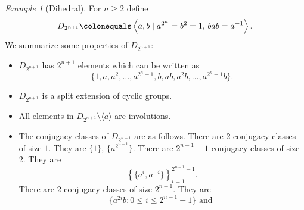 \documentclass{dcthesis}
\numberwithin{equation}{section}
\theoremstyle{definition}
\theoremstyle{remark}
\newtheorem{example}[equation]{Example}
\begin{document}
{{      %
    \begin{example}[Dihedral]
      \label{exm:dihedral}
      For $n\geq 2$ define
      \begin{equation}
        \label{eqn:dihedral}
        D_{2^{n+1}}\colonequals
        \left\langle
          a,b\mid
          a^{2^{n}}=
          b^2=1,
          \,
          bab=a^{-1}
        \right\rangle.
      \end{equation}
      We summarize some properties of $D_{2^{n+1}}$:
      \begin{itemize}
        \item
          $D_{2^{n+1}}$ has $2^{n+1}$ elements which can be written as
          \begin{equation}
            \label{eqn:elementsofdihedral}
            \{
              1,a,a^2,\dots,a^{2^n-1},
              b,ab,a^2b,\dots,a^{2^n-1}b
            \}.
          \end{equation}
        \item
          $D_{2^{n+1}}$ is a split extension
          of cyclic groups.
        \item
          All elements in $D_{2^{n+1}}\setminus\langle a\rangle$ are involutions.
        \item
          The conjugacy classes of $D_{2^{n+1}}$ are as follows.
          There are $2$ conjugacy classes
          of size $1$.
          They are $\{1\}$, $\{a^{2^{n-1}}\}$.
          There are $2^{n-1}-1$ conjugacy classes of
          size $2$.
          They are
          \begin{equation}
            \label{eqn:conjclassesdihedral}
            \left\{
              \{a^i,a^{-i}\}
            \right\}
            _{i=1}^{2^{n-1}-1}.
          \end{equation}
          There are $2$ conjugacy classes of
          size $2^{n-1}$. They are
          \begin{equation}
            \label{eqn:conjclassesdihedralbiggest}
            \{a^{2i}b : 0\leq i\leq 2^{n-1}-1\}
            \text{ and }

\end{equation}
\end{itemize}
\end{example}}}
\end{document}
